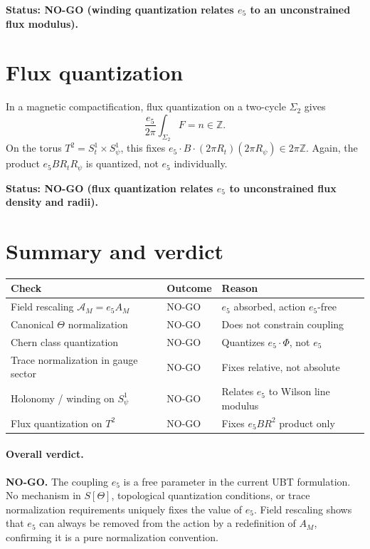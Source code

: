 \documentclass[11pt,a4paper]{article}
\begin{document}
\textbf{Status: NO-GO (winding quantization relates $e_5$ to an unconstrained
flux modulus).}

\section{Flux quantization}

In a magnetic compactification, flux quantization on a two-cycle $\Sigma_2$
gives
\begin{equation}
  \frac{e_5}{2\pi}\int_{\Sigma_2} F = n \in \mathbb{Z}.
\end{equation}
On the torus $T^2=S^1_t\times S^1_\psi$, this fixes
$e_5 \cdot B \cdot (2\pi R_t)(2\pi R_\psi) \in 2\pi\mathbb{Z}$.  Again,
the product $e_5 B R_t R_\psi$ is quantized, not $e_5$ individually.

\textbf{Status: NO-GO (flux quantization relates $e_5$ to unconstrained flux
density and radii).}

\section{Summary and verdict}

\begin{center}
\begin{tabular}{@{}lll@{}}
\toprule
Check & Outcome & Reason \\
\midrule
Field rescaling $\mathcal{A}_M=e_5 A_M$ & NO-GO & $e_5$ absorbed, action $e_5$-free \\
Canonical $\Theta$ normalization & NO-GO & Does not constrain coupling \\
Chern class quantization & NO-GO & Quantizes $e_5\cdot\Phi$, not $e_5$ \\
Trace normalization in gauge sector & NO-GO & Fixes relative, not absolute \\
Holonomy / winding on $S^1_\psi$ & NO-GO & Relates $e_5$ to Wilson line modulus \\
Flux quantization on $T^2$ & NO-GO & Fixes $e_5 B R^2$ product only \\
\bottomrule
\end{tabular}
\end{center}

\paragraph{Overall verdict.}
\textbf{NO-GO.}
The coupling $e_5$ is a free parameter in the current UBT formulation.  No
mechanism in $S[\Theta]$, topological quantization conditions, or trace
normalization requirements uniquely fixes the value of $e_5$.  Field rescaling
shows that $e_5$ can always be removed from the action by a redefinition of
$A_M$, confirming it is a pure normalization convention.
\end{document}
